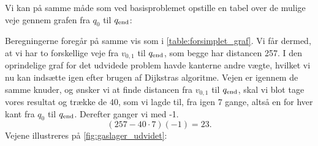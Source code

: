 Vi kan på samme måde som ved basisproblemet opstille en tabel over de mulige veje gennem grafen fra $q_0$ til $q_{\textrm{end}}$:

 


Beregningerne foregår på samme vis som i \autoref{table:forsimplet_graf}. Vi får dermed, at vi har to forskellige veje fra $v_{0,1}$ til $q_{\textrm{end}}$, som begge har distancen 257. I den oprindelige graf for det udvidede problem havde kanterne andre vægte, hvilket vi nu kan indsætte igen efter brugen af Dijkstras algoritme. Vejen er igennem de samme knuder, og ønsker vi at finde distancen fra $v_{0,1}$ til $q_{\textrm{end}}$, skal vi blot tage vores resultat og trække de 40, som vi lagde til, fra igen 7 gange, altså en for hver kant fra $q_{0}$ til $q_{\textrm{end}}$. Derefter ganger vi med -1.
\begin{equation}
(257-40 \cdot 7)(-1) = 23.
\end{equation}
Vejene illustreres på \autoref{fig:gaslager_udvidet}:



